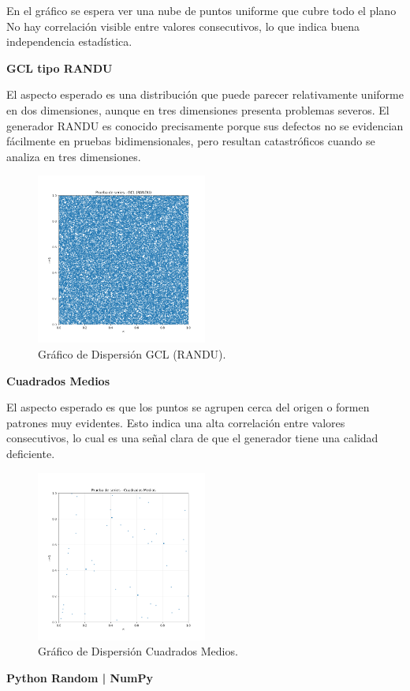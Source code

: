 \documentclass{article}
\begin{document}
En el gráfico se espera ver una nube de puntos uniforme que cubre todo el plano
No hay correlación visible entre valores consecutivos, lo que indica buena independencia estadística.

\textbf{GCL tipo RANDU}

El aspecto esperado es una distribución que puede parecer relativamente uniforme en dos dimensiones, aunque en tres dimensiones presenta problemas severos. El generador RANDU es conocido precisamente porque sus defectos no se evidencian fácilmente en pruebas bidimensionales, pero resultan catastróficos cuando se analiza en tres dimensiones.
\begin{figure}[H]
\centering
\includegraphics[width=0.5\textwidth]{Imagenes/series_GCL (RANDU).png}
\caption{Gráfico de Dispersión GCL (RANDU).}
\end{figure}

\textbf{Cuadrados Medios}

El aspecto esperado es que los puntos se agrupen cerca del origen o formen patrones muy evidentes. Esto indica una alta correlación entre valores consecutivos, lo cual es una señal clara de que el generador tiene una calidad deficiente.

\begin{figure}[H]
\centering
\includegraphics[width=0.5\textwidth]{Imagenes/series_Cuadrados Medios.png}
\caption{Gráfico de Dispersión Cuadrados Medios.}
\end{figure}
\textbf{Python Random | NumPy}
\end{document}
